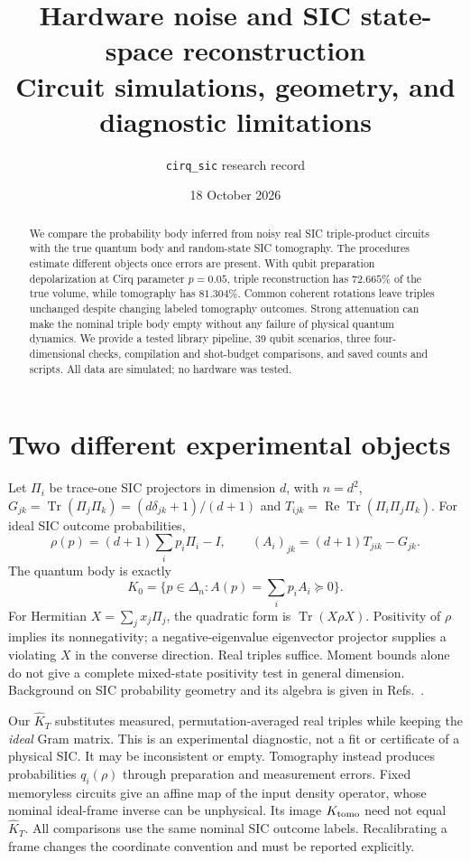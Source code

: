 \documentclass[11pt]{article}
\title{Hardware noise and SIC state-space reconstruction\\\large Circuit simulations, geometry, and diagnostic limitations}
\author{\texttt{cirq\_sic} research record}
\date{18 October 2026}
\begin{document}
\maketitle
\begin{abstract}
We compare the probability body inferred from noisy real SIC triple-product
circuits with the true quantum body and random-state SIC tomography.
The procedures estimate different objects once errors are present. With qubit
preparation depolarization at Cirq parameter $p=0.05$, triple reconstruction has
$72.665\%$ of the true volume, while tomography has $81.304\%$. Common coherent
rotations leave triples unchanged despite changing labeled tomography outcomes.
Strong attenuation can make the nominal triple body empty without any failure
of physical quantum dynamics. We provide a tested library pipeline, 39 qubit
scenarios, three four-dimensional checks, compilation and shot-budget comparisons,
and saved counts and scripts. All data are simulated; no hardware was tested.
\end{abstract}

\section{Two different experimental objects}
Let $\Pi_i$ be trace-one SIC projectors in dimension $d$, with $n=d^2$,
$G_{jk}=\operatorname{Tr}(\Pi_j\Pi_k)=(d\delta_{jk}+1)/(d+1)$ and
$T_{ijk}=\operatorname{Re}\operatorname{Tr}(\Pi_i\Pi_j\Pi_k)$.
For ideal SIC outcome probabilities,
\begin{equation}
\rho(p)=(d+1)\sum_i p_i\Pi_i-I,\qquad
(A_i)_{jk}=(d+1)T_{jik}-G_{jk}.
\end{equation}
The quantum body is exactly
\begin{equation}
K_0=\{p\in\Delta_n:A(p)=\sum_i p_iA_i\succeq0\}.
\end{equation}
For Hermitian $X=\sum_jx_j\Pi_j$, the quadratic form is
$\operatorname{Tr}(X\rho X)$. Positivity of $\rho$ implies its nonnegativity;
a negative-eigenvalue eigenvector projector supplies a violating $X$ in the
converse direction. Real triples suffice. Moment bounds alone do not give a
complete mixed-state positivity test in general dimension. Background on SIC
probability geometry and its algebra is given in Refs.~\cite{qbist,algebra}.

Our $\widehat K_T$ substitutes measured, permutation-averaged real triples while
keeping the \emph{ideal} Gram matrix. This is an experimental diagnostic, not a
fit or certificate of a physical SIC. It may be inconsistent or empty.
Tomography instead produces probabilities $q_i(\rho)$ through preparation and
measurement errors. Fixed memoryless circuits give an affine map of the input
density operator, whose nominal ideal-frame inverse can be unphysical.
Its image $K_{\rm tomo}$ need not equal $\widehat K_T$.
All comparisons use the same nominal SIC outcome labels. Recalibrating a frame
changes the coordinate convention and must be reported explicitly.
\end{document}
